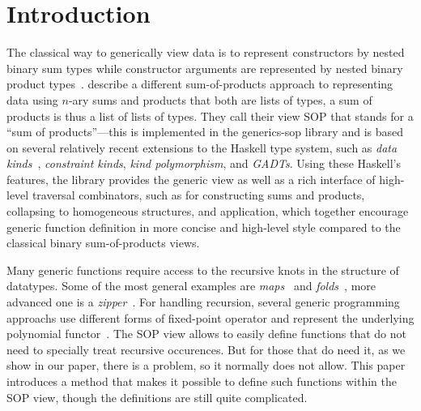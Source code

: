 \documentclass[acmsmall,review,anonymous]{acmart}\settopmatter{printfolios=true,printccs=false,printacmref=false}
\begin{document}
\maketitle


\section{Introduction}

The classical way to generically view data is to represent constructors by nested binary sum types while constructor arguments are represented by nested binary product types~\citep{VanNoort2008, MuRec2009, Cheney2002, Magalhaes2010}\nocite{Rodriguez2008}. \citet{VriLoeh2014} describe a different sum-of-products approach to representing data using $n$-ary sums and products that both are lists of types, a sum of products is thus a list of lists of types. They call their view SOP that stands for a ``sum of products''---this is implemented in the \textsf{generics-sop} library and is based on several relatively recent extensions to the Haskell type system, such as \emph{data kinds}~\citep{Yorgey2012}, \emph{constraint kinds}, \emph{kind polymorphism}, and \emph{GADTs}. Using these Haskell's features, the library provides the generic view as well as a rich interface of high-level traversal combinators, such as for constructing sums and products, collapsing to homogeneous structures, and application, which together encourage generic function definition in more concise and high-level style compared to the classical binary sum-of-products views.

Many generic functions require access to the recursive knots in the structure of datatypes. Some of the most general examples are \emph{maps}~\citep{Magalhaes2010} and \emph{folds}~\citep{Meijer1991, MuRec2009}, more advanced one is a \emph{zipper}~\citep{Huet1997, MuRec2009, HiJeLo2004}. For handling recursion, several generic programming approachs use different forms of fixed-point operator and represent the underlying polynomial functor~\citep{VanNoort2008, MuRec2009, Jansson1997, Loeh2011}\nocite{MagLoeh2012}. The SOP view allows to easily define functions that do not need to specially treat recursive occurences. But for those that do need it, as we show in our paper, there is a problem, so it normally does not allow. This paper introduces a method that makes it possible to define such functions within the SOP view, though the definitions are still quite complicated.
\end{document}
